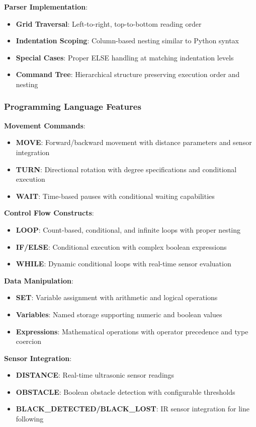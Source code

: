 \textbf{Parser Implementation}:
\begin{itemize}
    \item \textbf{Grid Traversal}: Left-to-right, top-to-bottom reading order
    \item \textbf{Indentation Scoping}: Column-based nesting similar to Python syntax
    \item \textbf{Special Cases}: Proper ELSE handling at matching indentation levels
    \item \textbf{Command Tree}: Hierarchical structure preserving execution order and nesting
\end{itemize}

\subsubsection{Programming Language Features}
\textbf{Movement Commands}:
\begin{itemize}
    \item \textbf{MOVE}: Forward/backward movement with distance parameters and sensor integration
    \item \textbf{TURN}: Directional rotation with degree specifications and conditional execution
    \item \textbf{WAIT}: Time-based pauses with conditional waiting capabilities
\end{itemize}

\textbf{Control Flow Constructs}:
\begin{itemize}
    \item \textbf{LOOP}: Count-based, conditional, and infinite loops with proper nesting
    \item \textbf{IF/ELSE}: Conditional execution with complex boolean expressions
    \item \textbf{WHILE}: Dynamic conditional loops with real-time sensor evaluation
\end{itemize}

\textbf{Data Manipulation}:
\begin{itemize}
    \item \textbf{SET}: Variable assignment with arithmetic and logical operations
    \item \textbf{Variables}: Named storage supporting numeric and boolean values
    \item \textbf{Expressions}: Mathematical operations with operator precedence and type coercion
\end{itemize}

\textbf{Sensor Integration}:
\begin{itemize}
    \item \textbf{DISTANCE}: Real-time ultrasonic sensor readings
    \item \textbf{OBSTACLE}: Boolean obstacle detection with configurable thresholds
    \item \textbf{BLACK\_DETECTED/BLACK\_LOST}: IR sensor integration for line following
\end{itemize}

